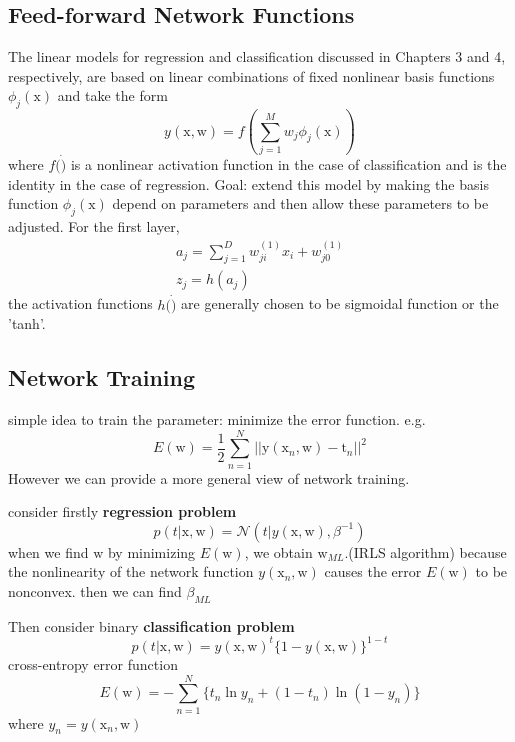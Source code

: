 \documentclass[a4paper]{book}
\begin{document}
\subsection{Feed-forward Network Functions}
The linear models for regression and classification discussed in Chapters 3 and 4, respectively, are based on linear combinations of fixed nonlinear basis functions $\phi_j(\mathrm x)$ and take the form 
\begin{equation}\label{eq3.4.1}
  y(\mathrm x,\mathrm w) = f(\sum_{j=1}^Mw_j\phi_j(\mathrm x))
\end{equation}
where $f(\dot)$ is a nonlinear activation function in the case of classification and is the identity in the case of regression.\newline
Goal: extend this model by making the basis function $\phi_j(\mathrm x)$ depend on parameters and then allow these parameters to be adjusted.\newline
For the first layer,
\begin{gather}\label{eq3.4.2}
a_j=\sum_{j=1}^Dw_{ji}^{(1)}x_i+w_{j0}^{(1)} \\
z_j=h(a_j)
\end{gather}
the activation functions $h(\dot)$  are generally chosen to be sigmoidal function or the 'tanh'.
\subsection{Network Training}
simple idea to train the parameter: minimize the error function. e.g.
\begin{equation}\label{eq3.4.3}
  E(\mathrm w) = \frac12\sum_{n=1}^N||\mathrm y(\mathrm x_n,\mathrm w)-\mathrm t_n||^2
\end{equation}
However we can provide a more general view of network training.

consider firstly \textbf{regression problem}
$$p(t|\mathrm x,\mathrm w) = \mathcal N(t|y(\mathrm x,\mathrm w),\beta^{-1})$$
when we find $\mathrm w$ by minimizing $E(\mathrm w)$, we obtain $\mathrm w_{ML}$.(IRLS algorithm) because the nonlinearity of the network function $y(\mathrm x_n,\mathrm w)$ causes the error $E(\mathrm w)$ to be nonconvex.  then we can find $\beta_{ML}$

Then consider binary \textbf{classification problem}
$$p(t|\mathrm  x,\mathrm w) = y(\mathrm  x,\mathrm  w)^t\{1-y(\mathrm  x,\mathrm  w)\}^{1-t}$$
cross-entropy error function 
\begin{equation}\label{eq3.4.4}
E(\mathrm w) = -\sum_{n=1}^N\{t_n\ln y_n+(1-t_n)\ln(1-y_n)\}
\end{equation}
where $y_n = y(\mathrm x_n,\mathrm w)$
\end{document}
